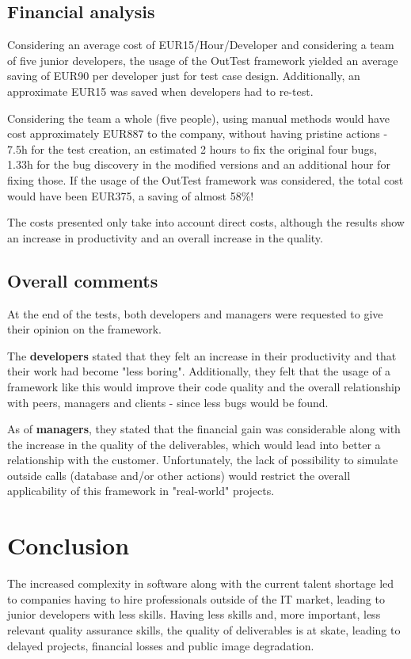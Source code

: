 \documentclass{sigchi}
\begin{document}
\subsection{Financial analysis}
Considering an average cost of EUR15/Hour/Developer and considering a team of five junior developers, the usage of the OutTest framework yielded an average saving of EUR90 per developer just for test case design. Additionally, an approximate EUR15 was saved when developers had to re-test.

Considering the team a whole (five people), using manual methods would have cost approximately EUR887 to the company, without having pristine actions - 7.5h for the test creation, an estimated 2 hours to fix the original four bugs, 1.33h for the bug discovery in the modified versions and an additional hour for fixing those.
If the usage of the OutTest framework was considered, the total cost would have been EUR375, a saving of almost 58\%!

The costs presented only take into account direct costs, although the results show an increase in productivity and an overall increase in the quality.

\subsection{Overall comments}
At the end of the tests, both developers and managers were requested to give their opinion on the framework. 

The \textbf{developers} stated that they felt an increase in their productivity and that their work had become "less boring". Additionally, they felt that the usage of a framework like this would improve their code quality and the overall relationship with peers, managers and clients - since less bugs would be found.

As of \textbf{managers}, they stated that the financial gain was considerable along with the increase in the quality of the deliverables, which would lead into better a relationship with the customer. Unfortunately, the lack of possibility to simulate outside calls (database and/or other actions) would restrict the overall applicability of this framework in "real-world" projects.

\section{Conclusion}
The increased complexity in software along with the current talent shortage led to companies having to hire professionals outside of the IT market, leading to junior developers with less skills. Having less skills and, more important, less relevant quality assurance skills, the quality of deliverables is at skate, leading to delayed projects, financial losses and public image degradation.
\end{document}
